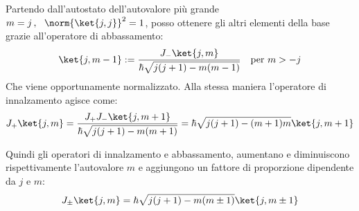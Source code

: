Partendo dall'autostato dell'autovalore più grande \(m=j\,, \ \  \norm{\ket{j,j}}^2 = 1\), posso ottenere gli altri elementi della base grazie all'operatore di abbassamento:
\[
    \ket{j, m-1} := \frac{J_- \ket{j,m}}{\hbar \sqrt{j(j+1) - m(m-1)}} \quad \text{per } m > -j
\]
Che viene opportunamente normalizzato. Alla stessa maniera l'operatore di innalzamento agisce come:
\[
    J_+ \ket{j,m} = \frac{J_+ J_- \ket{j,m+1}}{\hbar \sqrt{j(j+1) - m(m+1)}} = \hbar \sqrt{j(j+1)-(m+1)m} \ket{j, m+1}
\]

Quindi gli operatori di innalzamento e abbassamento, aumentano e diminuiscono rispettivamente l'autovalore \(m \) e aggiungono un fattore di proporzione dipendente da \(j\) e \(m\):
\begin{equation}
    J_\pm \ket{j,m} = \hbar \sqrt{j(j+1)-m(m\pm 1)} \ket{j, m \pm 1}
\end{equation}

